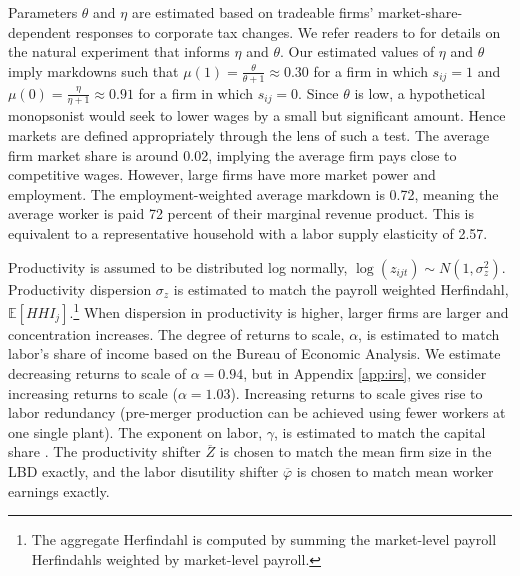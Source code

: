 \documentclass[12pt]{article}
\theoremstyle{prop}
\begin{document}


Parameters $\theta$ and $\eta$ are estimated based on tradeable firms' market-share-dependent responses to  corporate tax changes. We refer readers to  for details on the natural experiment that informs $\eta$ and $\theta$. 
Our estimated values of $\eta$ and $\theta$ imply markdowns such that $\mu(1)=\frac{\theta}{\theta+1}\approx0.30$ for a firm in which $s_{ij}=1$  and $\mu(0)=\frac{\eta}{\eta+1}\approx 0.91$ for a firm in which $s_{ij}=0$. 
Since $\theta$ is low, a hypothetical monopsonist {would} seek to lower wages by a small but significant amount. Hence markets are defined appropriately through the lens of such a test.
The average firm market share is around 0.02, implying the average firm pays close to competitive wages. 
However, large firms have more market power and employment. The employment-weighted average markdown is 0.72, meaning the average worker is paid 72 percent of their marginal revenue product. 
This is equivalent to a representative household with a labor supply elasticity of 2.57. 

Productivity is assumed to be distributed log normally, $\log(z_{ijt}) \sim 	N(1,\sigma_z^2)$.
Productivity dispersion $\sigma_{{z}}$  is estimated to match the payroll weighted Herfindahl, $\mathbb{E}[HHI_j]$.\footnote{
    The aggregate Herfindahl is computed by summing the market-level payroll Herfindahls weighted by market-level payroll.}
When dispersion in productivity is higher, larger firms are larger and concentration increases.
The degree of returns to scale, $\alpha$, is estimated  to match labor's share of income based on the Bureau of Economic Analysis.   We estimate decreasing returns to scale of  $\alpha=0.94$, but in Appendix \ref{app:irs}, we consider increasing returns to scale ($\alpha=1.03$). Increasing returns to scale gives rise to labor redundancy (pre-merger production can be achieved using fewer workers at one single plant).
The exponent on labor, $\gamma$, is estimated  to match the capital share \citep{barkai2016declining}.
The productivity shifter $\overline{Z}$ is chosen to match the mean firm size in the LBD exactly, and the labor disutility shifter $\overline{\varphi}$ is chosen to match mean worker earnings exactly.


%
 
%

\end{document}
